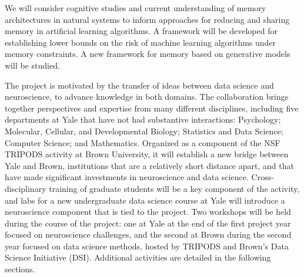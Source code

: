 We will consider cognitive studies and
current understanding of memory architectures in natural systems
to inform approaches for reducing and sharing memory in
artificial learning algorithms. A framework will be developed for
establishing lower bounds on the risk of machine learning algorithms under
memory constraints. A new framework for memory based on generative models
will be studied.
\vskip5pt

The project is motivated by the transfer of ideas between data science
and neuroscience, to advance knowledge in both domains. The
collaboration brings together perspectives and expertise from many
different disciplines, including five departments at Yale that have
not had substantive interactions: Psychology; Molecular, Cellular, and
Developmental Biology; Statistics and Data Science; Computer Science; and
Mathematics. Organized as a component of the NSF TRIPODS activity at
Brown University, it will establish a new bridge between Yale and
Brown, institutions that are a relatively short distance apart, and
that have made significant investments in neuroscience and data
science. Cross-disciplinary training of graduate students will be a
key component of the activity, and labs for a new undergraduate data
science course at Yale will introduce a neuroscience component that is
tied to the project.  Two workshops will be held during the course of
the project: one at Yale at the end of the first project year focused on neuroscience challenges, and the second at Brown during the second year focused on data science methods, hosted by TRIPODS and Brown's Data Science Initiative (DSI). Additional activities are detailed in the following sections.




